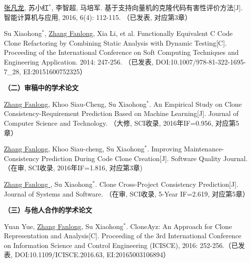 \begin{publist}
\item
\underline{张凡龙}, 苏小红{$^*$},  李智超,  马培军. 基于支持向量机的克隆代码有害性评价方法[J]. 智能计算机与应用, 2016, 6(4): 112-115. 
（已发表, 对应第3章）

\item
Su Xiaohong{$^*$}, \underline{Zhang Fanlong},  Xia Li, et al. Functionally Equivalent C Code Clone Refactoring by Combining Static Analysis with Dynamic Testing[C]. Proceeding of the International Conference on Soft Computing Techniques and Engineering Application. 2014: 247-256.
（已发表, DOI:10.1007/978-81-322-1695-7\_28, EI:20151600752325）
\end{publist}

\noindent\textbf{（二）审稿中的学术论文}
\begin{publist}

\item
\underline{Zhang Fanlong},  Khoo Siau-Cheng, Su Xiaohong{$^*$}. An Empirical Study on Clone Consistency-Requirement Prediction Based on Machine Learning[J]. Journal of Computer Science and Technology.
（大修, SCI收录, 2016年IF=0.956, 对应第5章）

\item
\underline{Zhang Fanlong}, Khoo Siau-cheng, Su Xiaohong{$^*$}. Improving Maintenance-Consistency Prediction During Code Clone Creation[J]. Software Quality Journal. 
（在审, SCI收录, 2016年IF=1.816, 对应第3章)
\item
\underline{Zhang Fanlong }, Su Xiaohong{$^*$}. Clone Cross-Project Consistency Prediction[J]. Journal of Systems and Software.
（在审, SCI收录, 5-Year IF=2.619, 对应第5章）



\end{publist}

\noindent\textbf{（三）与他人合作的学术论文}
\begin{publist}
\item
Yuan Yue, \underline{Zhang Fanlong},  Su Xiaohong{$^*$}. CloneAyz: An Approach for Clone Representation and Analysis[C]. Proceeding of the 3rd International Conference on Information Science and Control Engineering (ICISCE), 2016: 252-256.（已发表, DOI:10.1109/ICISCE.2016.63, EI:20165003106894）
\end{publist}

